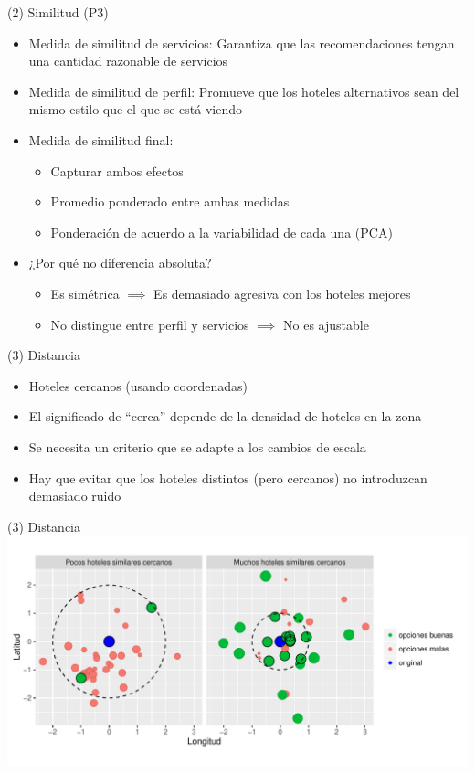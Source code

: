 \documentclass{beamer}
\begin{document}
\begin{frame}{(2) Similitud (P3)}
	\begin{itemize}%
		\item Medida de similitud de servicios: Garantiza que las recomendaciones tengan una cantidad razonable de servicios
		\item Medida de similitud de perfil: Promueve que los hoteles alternativos sean del mismo estilo que el que se está viendo
		\item Medida de similitud final:
		\begin{itemize}
			\item Capturar ambos efectos
			\item Promedio ponderado entre ambas medidas
			\item Ponderación de acuerdo a la variabilidad de cada una (PCA)
		\end{itemize}
		\item ¿Por qué no diferencia absoluta?
		\begin{itemize}
			\item Es simétrica $\implies$ Es demasiado agresiva con los hoteles mejores
			\item No distingue entre perfil y servicios $\implies$ No es ajustable
		\end{itemize}
	\end{itemize}
\end{frame}

\begin{frame}{(3) Distancia}
	\begin{itemize}%
		\item Hoteles cercanos (usando coordenadas)
		\item El significado de ``cerca'' depende de la densidad de hoteles en la zona
		\item Se necesita un criterio que se adapte a los cambios de escala
		\item Hay que evitar que los hoteles distintos (pero cercanos) no introduzcan demasiado ruido
	\end{itemize}
\end{frame}

\begin{frame}{(3) Distancia}
	\includegraphics[width=\textwidth]{imagenes/distdin.pdf}
\end{frame}
\end{document}
